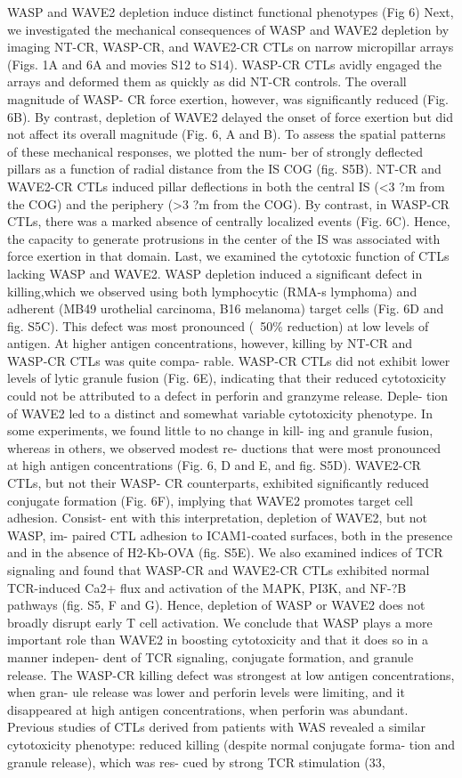 WASP and WAVE2 depletion induce distinct functional phenotypes (Fig 6)
Next, we investigated the mechanical consequences of WASP and WAVE2 depletion by imaging NT-CR, WASP-CR, and WAVE2-CR CTLs on narrow micropillar arrays (Figs. 1A and 6A and movies S12 to S14). WASP-CR CTLs avidly engaged the arrays and deformed them as quickly as did NT-CR controls. The overall magnitude of WASP- CR force exertion, however, was significantly reduced (Fig. 6B). By contrast, depletion of WAVE2 delayed the onset of force exertion but did not affect its overall magnitude (Fig. 6, A and B). To assess the spatial patterns of these mechanical responses, we plotted the num- ber of strongly deflected pillars as a function of radial distance from the IS COG (fig. S5B). NT-CR and WAVE2-CR CTLs induced pillar deflections in both the central IS (<3 ?m from the COG) and the periphery (>3 ?m from the COG). By contrast, in WASP-CR CTLs, there was a marked absence of centrally localized events (Fig. 6C). Hence, the capacity to generate protrusions in the center of the IS was associated with force exertion in that domain. Last, we examined the cytotoxic function of CTLs lacking WASP and WAVE2. WASP depletion induced a significant defect in killing,which we observed using both lymphocytic (RMA-s lymphoma) and adherent (MB49 urothelial carcinoma, B16 melanoma) target cells (Fig. 6D and fig. S5C). This defect was most pronounced (~50\% reduction) at low levels of antigen. At higher antigen concentrations, however, killing by NT-CR and WASP-CR CTLs was quite compa- rable. WASP-CR CTLs did not exhibit lower levels of lytic granule fusion (Fig. 6E), indicating that their reduced cytotoxicity could not be attributed to a defect in perforin and granzyme release. Deple- tion of WAVE2 led to a distinct and somewhat variable cytotoxicity phenotype. In some experiments, we found little to no change in kill- ing and granule fusion, whereas in others, we observed modest re- ductions that were most pronounced at high antigen concentrations (Fig. 6, D and E, and fig. S5D). WAVE2-CR CTLs, but not their WASP- CR counterparts, exhibited significantly reduced conjugate formation (Fig. 6F), implying that WAVE2 promotes target cell adhesion. Consist- ent with this interpretation, depletion of WAVE2, but not WASP, im- paired CTL adhesion to ICAM1-coated surfaces, both in the presence and in the absence of H2-Kb-OVA (fig. S5E). We also examined indices of TCR signaling and found that WASP-CR and WAVE2-CR CTLs exhibited normal TCR-induced Ca2+ flux and activation of the MAPK, PI3K, and NF-?B pathways (fig. S5, F and G). Hence, depletion of WASP or WAVE2 does not broadly disrupt early T cell activation. We conclude that WASP plays a more important role than WAVE2 in boosting cytotoxicity and that it does so in a manner indepen- dent of TCR signaling, conjugate formation, and granule release. The WASP-CR killing defect was strongest at low antigen concentrations, when gran- ule release was lower and perforin levels were limiting, and it disappeared at high antigen concentrations, when perforin was abundant. Previous studies of CTLs derived from patients with WAS revealed a similar cytotoxicity phenotype: reduced killing (despite normal conjugate forma- tion and granule release), which was res- cued by strong TCR stimulation (33, 